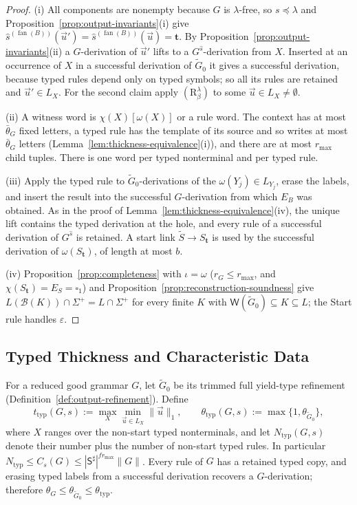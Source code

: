 \documentclass[11pt]{article}
\numberwithin{equation}{section}
\theoremstyle{plain}
\theoremstyle{definition}
\theoremstyle{remark}
\newcommand{\Wit}{\mathsf{W}}
\newcommand{\tuple}[1]{\vec{#1}}
\newcommand{\blank}{\square}
\newcommand{\eps}{\varepsilon}
\newcommand{\fan}{\operatorname{fan}}
\begin{document}
\begin{proof}
(i) All components are nonempty because $G$ is $\lambda$-free, so $s\preceq\lambda$
and Proposition~\ref{prop:output-invariants}(i) give
$\widehat s^{(\fan(B))}(\tuple u')=\widehat s^{(\fan(B))}(\tuple u)=\mathbf t$.  By
Proposition~\ref{prop:output-invariants}(ii) a $G$-derivation of $\tuple u'$ lifts
to a $G^{\widehat s}$-derivation from $X$.  Inserted at an occurrence of $X$ in a
successful derivation of $\widetilde G_0$ it gives a successful derivation,
because typed rules depend only on typed symbols; so all its rules are
retained and $\tuple u'\in L_X$.  For the second claim apply
$(\mathrm R_\beta^\lambda)$ to some $\tuple u\in L_X\ne\emptyset$.

(ii) A witness word is $\chi(X)[\omega(X)]$ or a rule word.  The context has at
most $\bar\theta_G$ fixed letters, a typed rule has the template of its source
and so writes at most $\bar\theta_G$ letters
(Lemma~\ref{lem:thickness-equivalence}(i)), and there are at most $r_{\max}$
child tuples.  There is one word per typed nonterminal and per typed rule.

(iii) Apply the typed rule to $\widetilde G_0$-derivations of the
$\omega(Y_j)\in L_{Y_j}$, erase the labels, and insert the result into the
successful $G$-derivation from which $E_B$ was obtained.  As in the proof of
Lemma~\ref{lem:thickness-equivalence}(iv), the unique lift contains the typed
derivation at the hole, and every rule of a successful derivation of
$G^{\widehat s}$ is retained.  A start link $\widetilde S\to S_{\mathbf t}$ is used by
the successful derivation of $\omega(S_{\mathbf t})$, of length at most $b$.

(iv) Proposition~\ref{prop:completeness} with $\iota=\omega$ ($r_G\le r_{\max}$,
and $\chi(S_{\mathbf t})=E_S=\blank_1$) and
Proposition~\ref{prop:reconstruction-soundness} give
$L(\mathcal B(K))\cap\Sigma^+=L\cap\Sigma^+$ for every finite $K$ with
$\Wit(\widetilde G_0)\subseteq K\subseteq L$; the Start rule handles $\eps$.
\end{proof}

\subsection{Typed Thickness and Characteristic Data}
\label{subsec:typed-thickness}

For a reduced good grammar $G$, let $\widetilde G_0$ be its trimmed
full yield-type refinement (Definition~\ref{def:output-refinement}).  Define
\[
 t_{\mathrm{typ}}(G,s):=\max_{X}\min_{\tuple u\in L_X}\|\tuple u\|_1,
 \qquad \theta_{\mathrm{typ}}(G,s):=\max\{1,\theta_{\widetilde G_0}\},
\]
where $X$ ranges over the non-start typed nonterminals, and let
$N_{\mathrm{typ}}(G,s)$ denote their number plus the number of non-start
typed rules.  In particular $N_{\mathrm{typ}}\le C_s(G)\le
|\mathsf S^\sharp|^{fr_{\max}}\|G\|$.  Every rule of $G$ has a retained typed copy, and erasing typed labels
from a successful derivation recovers a $G$-derivation; therefore
$\theta_G\le\theta_{\widetilde G_0}\le\theta_{\mathrm{typ}}$.
\end{document}
